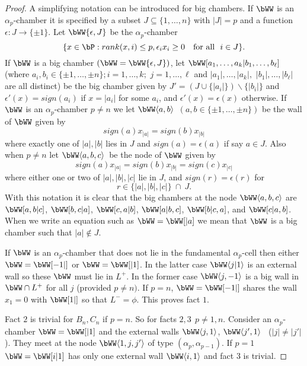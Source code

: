 \documentclass{memo-l}
\theoremstyle{definition}
\theoremstyle{remark}
\numberwithin{section}{chapter}
\numberwithin{equation}{chapter}
\begin{document}
\begin{proof}
   A simplifying notation can be introduced for big chambers.  If
$\bWW$ is an ${\alpha}_{p}$-chamber it is specified
by a subset $J {\subseteq} \{1,\ldots ,n\}$ with $\vert J\vert = p$
and a function ${\epsilon}:J {\to} \{{\pm}1\}$.  Let
$\bWW\{{\epsilon},J\}$ be the  ${\alpha}_{p}$-chamber
$$
\{ x  \in  \bP: rank(x,i)\le p, {\epsilon}_{i}x_{i} \ge 0 \quad
{\text{for all}}\ \  i  \in  J\}.
$$
If $\bWW$ is a big chamber $(\bWW =
\bWW \{{\epsilon},J\})$,
let $\bWW[a_{1},\ldots ,a_{k}\vert b_{1},\ldots ,
b_{{\ell}}]$ (where
\newline
$a_{i},b_{i}  \in  \{{\pm}1,\ldots ,{\pm}n\}; i = 1,\ldots ,k;$
$j  = 1,\ldots ,{\ell}$ and $\vert a_{1}\vert ,\ldots, \vert a_{k}\vert ,$
$\vert b_{1}\vert , \ldots ,\vert b_{{\ell}}\vert$ are all distinct)
be the big chamber given by $J' =  (J \cup \{\vert a_{i}\vert \})\backslash
\{\vert b_{i}\vert \}$ and ${\epsilon}'(x) = sign(a_{i})$ if
$x = \vert a_{i}\vert$ for some $a_{i}$, and ${\epsilon}'(x) = {\epsilon}(x)$
otherwise.  If $\bWW$ is an ${\alpha}_{p}$-chamber
$p\ne n$ we let $\bWW\langle a,b\rangle $\ $(a, b  \in  \{{\pm}1,\ldots ,
{\pm}n\})$ be the wall of $\bWW$ given by
$$
sign(a)x_{|a|} = sign(b)x_{|b|}
$$
where exactly one of $\vert a\vert ,\vert b\vert$ lies in $J$ and
$sign(a) = {\epsilon}(a)$ if say $a  \in  J$.  Also when $p \ne n$ let
$\bWW \langle a,b,c\rangle $\ be the node of
$\bWW$ given by
$$
sign(a)x_{|a|} = sign(b)x_{|b|} = sign(c)x_{|c|}
$$
where either one or two of $\vert a\vert ,\vert b\vert ,\vert c\vert$ lie
in $J$, and $sign(r) = {\epsilon}(r)$ for
$$r  \in  \{\vert a\vert ,\vert b\vert ,\vert c\vert \}\  \cap \ J.$$
With this notation it is clear that the
big chambers at the node $\bWW\langle a,b,c\rangle
$ are
$\bWW[a,b\vert c]$,
$\bWW[b,c\vert a]$,
$\bWW[c,a\vert b]$,
$\bWW[a\vert b,c]$,
$\bWW[b\vert c,a]$, and
$\bWW[c\vert a,b]$.  When we write an equation
such as $\bWW = \bWW[\vert a]$
we mean that $\bWW$ is a big chamber such that
$\vert a\vert {\notin} J$.

If $\bWW$ is an ${\alpha}_{p}$-chamber that does not lie
in the fundamental $\alpha_p$-cell then either $\bWW =
\bWW[-1\vert ]$ or $\bWW
= \bWW[\vert 1]$.  In the latter case
$\bWW\langle j\vert 1\rangle $ is an
external wall so these $\bWW$ must lie in $L^{+}$.  In the
former case
$\bWW\langle j,-1\rangle $ is a big wall in
$\bWW \cap L^{+}$ for all $j$
(provided $p \ne n)$.  If $p = n$, $\bWW=
\bWW[-1\vert ]$ shares
the wall $x_{1} = 0$ with $\bWW[1\vert ]$ so that
$L^{-} = {\phi}$.  This	proves fact $1$.

   Fact $2$ is trivial for $B_{n},C_{n}$ if $p = n$.  So for facts
$2,3\ \  p \ne 1,n$.  Consider an ${\alpha}_{p}$-chamber
$\bWW=\bWW[\vert 1]$
and the external walls $\bWW\langle j,1\rangle$,
$\bWW\langle j',1\rangle$ \   ($\vert j\vert \ne \vert j'\vert$).
They meet at the node $\bWW\langle 1,j,j'\rangle$
of type	$({\alpha}_{p},{\alpha}_{p-1})$.  If $p = 1$
$\bWW = \bWW[i\vert 1]$
has only one external wall $\bWW\langle i,1\rangle
$ and
fact $3$ is trivial.


\end{proof}
\end{document}
